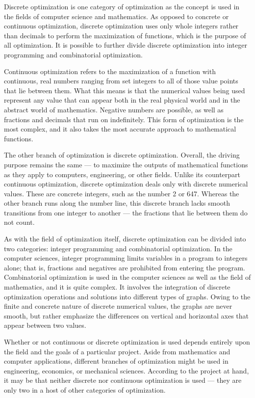 Discrete optimization is one category of optimization as the concept is used in the fields of computer science and mathematics. As opposed to concrete or continuous optimization, discrete optimization uses only whole integers rather than decimals to perform the maximization of functions, which is the purpose of all optimization. It is possible to further divide discrete optimization into integer programming and combinatorial optimization.

Continuous optimization refers to the maximization of a function with continuous, real numbers ranging from set integers to all of those value points that lie between them. What this means is that the numerical values being used represent any value that can appear both in the real physical world and in the abstract world of mathematics. Negative numbers are possible, as well as fractions and decimals that run on indefinitely. This form of optimization is the most complex, and it also takes the most accurate approach to mathematical functions.

The other branch of optimization is discrete optimization. Overall, the driving purpose remains the same — to maximize the outputs of mathematical functions as they apply to computers, engineering, or other fields. Unlike its counterpart continuous optimization, discrete optimization deals only with discrete numerical values. These are concrete integers, such as the number 2 or 647. Whereas the other branch runs along the number line, this discrete branch lacks smooth transitions from one integer to another — the fractions that lie between them do not count.

As with the field of optimization itself, discrete optimization can be divided into two categories: integer programming and combinatorial optimization. In the computer sciences, integer programming limits variables in a program to integers alone; that is, fractions and negatives are prohibited from entering the program. Combinatorial optimization is used in the computer sciences as well as the field of mathematics, and it is quite complex. It involves the integration of discrete optimization operations and solutions into different types of graphs. Owing to the finite and concrete nature of discrete numerical values, the graphs are never smooth, but rather emphasize the differences on vertical and horizontal axes that appear between two values.

Whether or not continuous or discrete optimization is used depends entirely upon the field and the goals of a particular project. Aside from mathematics and computer applications, different branches of optimization might be used in engineering, economics, or mechanical sciences. According to the project at hand, it may be that neither discrete nor continuous optimization is used — they are only two in a host of other categories of optimization.
